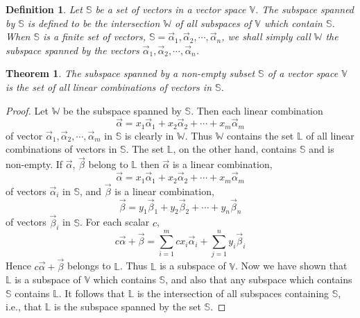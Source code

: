 \documentclass{article}
\newtheorem*{definition}{Definition}
\newtheorem{theorem}{Theorem}
\begin{document}
    \begin{definition}
        Let \(\mathbb{S}\) be a set of vectors in a vector space \(\mathbb{V}\). The subspace
        spanned by \(\mathbb{S}\) is defined to be the intersection \(\mathbb{W}\) of all 
        subspaces of \(\mathbb{V}\) which contain \(\mathbb{S}\). When \(\mathbb{S}\) is a 
        finite set of vectors, \(\mathbb{S} = {\vec{\alpha}_1, \vec{\alpha}_2, \cdots, \vec{\alpha}_n}\), we 
        shall simply call \(\mathbb{W}\) the subspace spanned by the vectors \(\vec{\alpha}_1, \vec{\alpha}_2, \cdots, \vec{\alpha}_n\).
    \end{definition}
    \begin{theorem}
        The subspace spanned by a non-empty subset \(\mathbb{S}\) of a vector space \(\mathbb{V}\)
        is the set of all linear combinations of vectors in \(\mathbb{S}\).
    \end{theorem}
    \begin{proof}
        Let \(\mathbb{W}\) be the subspace spanned by \(\mathbb{S}\). Then each linear combination
        \begin{equation*}
            \vec{\alpha} = x_{1} \vec{\alpha}_1 + x_{2} \vec{\alpha}_2 + \cdots + x_{m} \vec{\alpha}_m
        \end{equation*}
        of vector \(\vec{\alpha}_1, \vec{\alpha}_2, \cdots, \vec{\alpha}_m\) in \(\mathbb{S}\)
        is clearly in \(\mathbb{W}\). Thus \(\mathbb{W}\) contains the set \(\mathbb{L}\) of all 
        linear combinations of vectors in \(\mathbb{S}\). The set \(\mathbb{L}\), on the other hand, 
        contains \(\mathbb{S}\) and is non-empty. If \(\vec{\alpha}\), \(\vec{\beta}\) belong
        to \(\mathbb{L}\) then \(\vec{\alpha}\) is a linear combination,
        \begin{equation*}
            \vec{\alpha} = x_{1} \vec{\alpha}_1 + x_{2} \vec{\alpha}_2 + \cdots + x_{m} \vec{\alpha}_m
        \end{equation*}
        of vectors \(\vec{\alpha}_i\) in \(\mathbb{S}\), and \(\vec{\beta}\) is a linear combination,
        \begin{equation*}
            \vec{\beta} = y_{1} \vec{\beta}_1 + y_{2} \vec{\beta}_2 + \cdots + y_{n} \vec{\beta}_n
        \end{equation*}
        of vectors \(\vec{\beta}_i\) in \(\mathbb{S}\). For each scalar \(c\), 
        \begin{equation*}
            c \vec{\alpha} + \vec{\beta} = \sum_{i=1}^{m} c x_{i} \vec{\alpha}_i + \sum_{j=1}^{n} y_{i} \vec{\beta}_i
        \end{equation*}
        Hence \(c \vec{\alpha} + \vec{\beta}\) belongs to \(\mathbb{L}\). Thus \(\mathbb{L}\)
        is a subspace of \(\mathbb{V}\).
        Now we have shown that \(\mathbb{L}\) is a subspace of \(\mathbb{V}\) which contains
        \(\mathbb{S}\), and also that any subspace which contains \(\mathbb{S}\) contains \(\mathbb{L}\). 
        It follows that \(\mathbb{L}\) is the intersection of all subspaces containing \(\mathbb{S}\), 
        i.e., that \(\mathbb{L}\) is the subspace spanned by the set \(\mathbb{S}\).
    \end{proof}
\end{document}
